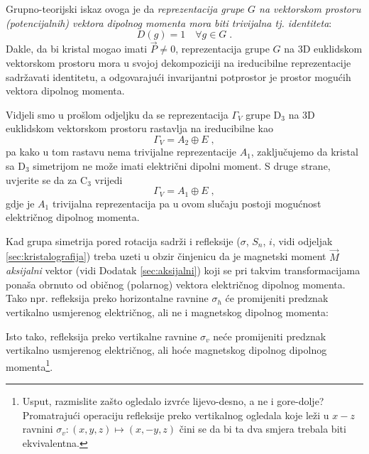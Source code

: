 Grupno-teorijski iskaz ovoga je da \emph{reprezentacija grupe $G$ na vektorskom
prostoru (potencijalnih) vektora dipolnog momenta mora biti trivijalna tj.
identiteta}:
\begin{displaymath}
   D(g)=1 \quad \forall g\in G \;.
\end{displaymath}
Dakle, da bi kristal mogao imati $\vec{P}\neq 0$, reprezentacija grupe $G$ na 
3D euklidskom vektorskom prostoru mora 
u svojoj dekompoziciji na ireducibilne reprezentacije sadržavati identitetu,
a odgovarajući invarijantni potprostor je prostor mogućih vektora dipolnog momenta.

Vidjeli smo u prošlom odjeljku da se reprezentacija $\Gamma_V$ grupe D$_3$ na 3D
euklidskom vektorskom prostoru rastavlja na ireducibilne kao
\begin{displaymath}
             \Gamma_V = A_2 \oplus E \;,
\end{displaymath}
pa kako u tom rastavu nema trivijalne reprezentacije $A_1$, zaključujemo
da kristal sa D$_3$ simetrijom ne može imati električni dipolni moment.
S druge strane, uvjerite se da za C$_3$ vrijedi
\begin{displaymath}
             \Gamma_V = A_1 \oplus E \;,
\end{displaymath}
gdje je $A_1$ trivijalna reprezentacija
pa u ovom slučaju postoji mogućnost električnog dipolnog momenta.


Kad grupa simetrija pored rotacija sadrži i refleksije ($\sigma$, $S_n$, $i$,
vidi odjeljak \ref{sec:kristalografija}) treba
uzeti u obzir činjenicu da je magnetski moment $\vec{M}$ \emph{aksijalni}
vektor (vidi Dodatak \ref{sec:aksijalni})
koji se pri takvim transformacijama ponaša obrnuto od običnog
(polarnog) vektora električnog dipolnog momenta.
Tako npr. refleksija preko horizontalne ravnine $\sigma_h$ će promijeniti
predznak vertikalno usmjerenog električnog, ali ne i
magnetskog dipolnog momenta:

\centerline{}

Isto tako, refleksija preko vertikalne ravnine $\sigma_v$ neće promijeniti
predznak vertikalno usmjerenog električnog, ali hoće
magnetskog dipolnog dipolnog momenta\footnote{ 
Usput, razmislite zašto ogledalo izvrće lijevo-desno, a ne i gore-dolje? Promatrajući
operaciju refleksije preko vertikalnog ogledala koje leži
u $x-z$ ravnini $\sigma_v:(x, y, z)\mapsto (x, -y, z)$
čini se da bi ta dva smjera trebala biti ekvivalentna.}.

